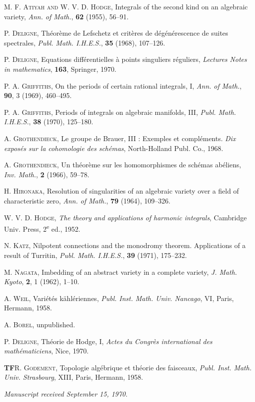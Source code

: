 \documentclass[10pt]{article}
\begin{document}
\begin{enumerate}[label={[\arabic*]},leftmargin=2.8em]
\item \textsc{M. F. Atiyah and W. V. D. Hodge}, Integrals of the second kind on an algebraic variety, \emph{Ann. of Math.}, \textbf{62} (1955), 56--91.
\item \textsc{P. Deligne}, Théorème de Lefschetz et critères de dégénérescence de suites spectrales, \emph{Publ. Math. I.H.E.S.}, \textbf{35} (1968), 107--126.
\item \textsc{P. Deligne}, Equations différentielles à points singuliers réguliers, \emph{Lectures Notes in mathematics}, \textbf{163}, Springer, 1970.
\item \textsc{P. A. Griffiths}, On the periods of certain rational integrals, I, \emph{Ann. of Math.}, \textbf{90}, 3 (1969), 460--495.
\item \textsc{P. A. Griffiths}, Periods of integrals on algebraic manifolds, III, \emph{Publ. Math. I.H.E.S.}, \textbf{38} (1970), 125--180.
\item \textsc{A. Grothendieck}, Le groupe de Brauer, III : Exemples et compléments. \emph{Dix exposés sur la cohomologie des schémas}, North-Holland Publ. Co., 1968.
\item \textsc{A. Grothendieck}, Un théorème sur les homomorphismes de schémas abéliens, \emph{Inv. Math.}, \textbf{2} (1966), 59--78.
\item \textsc{H. Hironaka}, Resolution of singularities of an algebraic variety over a field of characteristic zero, \emph{Ann. of Math.}, \textbf{79} (1964), 109--326.
\item \textsc{W. V. D. Hodge}, \emph{The theory and applications of harmonic integrals}, Cambridge Univ. Press, 2\textsuperscript{e} ed., 1952.
\item \textsc{N. Katz}, Nilpotent connections and the monodromy theorem. Applications of a result of Turritin, \emph{Publ. Math. I.H.E.S.}, \textbf{39} (1971), 175--232.
\item \textsc{M. Nagata}, Imbedding of an abstract variety in a complete variety, \emph{J. Math. Kyoto}, \textbf{2}, 1 (1962), 1--10.
\item \textsc{A. Weil}, Variétés kählériennes, \emph{Publ. Inst. Math. Univ. Nancago}, VI, Paris, Hermann, 1958.
\item \textsc{A. Borel}, unpublished.
\item \textsc{P. Deligne}, Théorie de Hodge, I, \emph{Actes du Congrès international des mathématiciens}, Nice, 1970.
\end{enumerate}

\noindent\textbf{TF}\quad \textsc{R. Godement}, Topologie algébrique et théorie des faisceaux, \emph{Publ. Inst. Math. Univ. Strasbourg}, XIII, Paris, Hermann, 1958.

\begin{center}
\emph{Manuscript received September 15, 1970.}
\end{center}

\end{document}

